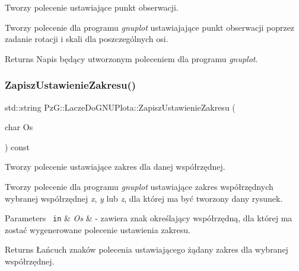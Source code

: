 Tworzy polecenie ustawiające punkt obserwacji. 

Tworzy polecenie dla programu {\itshape gnuplot} ustawiajające punkt obserwacji poprzez zadanie rotacji i skali dla poszczególnych osi. \begin{DoxyReturn}{Returns}
Napis będący utworzonym poleceniem dla programu {\itshape gnuplot}. 
\end{DoxyReturn}
\mbox{\label{class_pz_g_1_1_lacze_do_g_n_u_plota_a4579aecf7b4777fdde0cae4e98c275c2}} 
\subsubsection{\texorpdfstring{ZapiszUstawienieZakresu()}{ZapiszUstawienieZakresu()}}
{\footnotesize\ttfamily std\+::string Pz\+G\+::\+Lacze\+Do\+G\+N\+U\+Plota\+::\+Zapisz\+Ustawienie\+Zakresu (\begin{DoxyParamCaption}\item[{char}]{Os }\end{DoxyParamCaption}) const\hspace{0.3cm}{\ttfamily [protected]}}



Tworzy polecenie ustawiające zakres dla danej współrzędnej. 

Tworzy polecenie dla programu {\itshape gnuplot} ustawiające zakres współrzędnych wybranej współrzędnej {\itshape x}, {\itshape y} lub {\itshape z}, dla której ma być tworzony dany rysunek. 
\begin{DoxyParams}[1]{Parameters}
\mbox{\texttt{ in}}  & {\em Os} & -\/ zawiera znak określający współrzędną, dla której ma zostać wygenerowane polecenie ustawienia zakresu. \\
\hline
\end{DoxyParams}
\begin{DoxyReturn}{Returns}
Łańcuch znaków polecenia ustawiającego żądany zakres dla wybranej współrzędnej. 
\end{DoxyReturn}
\mbox{\label{class_pz_g_1_1_lacze_do_g_n_u_plota_a20a5d03e1fc19c682032bffc54340f12}} 
